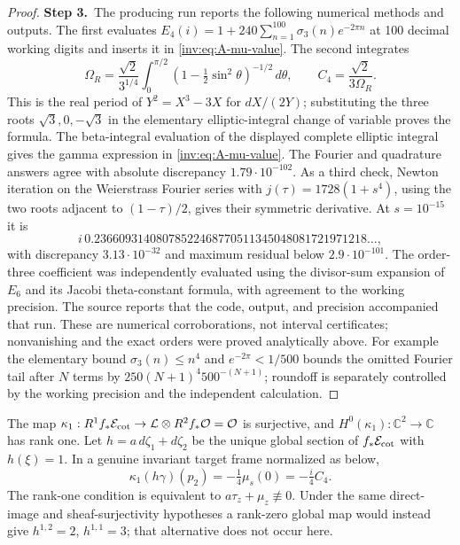\begin{proof}
\par\smallskip\noindent\textbf{Step 3.}\ The producing run reports the following numerical methods and outputs.  The first evaluates
$E_4(i)=1+240\sum_{n=1}^{100}\sigma_3(n)e^{-2\pi n}$ at 100
decimal working digits and inserts it in \eqref{inv:eq:A-mu-value}.
The second integrates
\[
\Omega_R=\frac{\sqrt2}{3^{1/4}}
\int_0^{\pi/2}(1-\tfrac12\sin^2\theta)^{-1/2}\,d\theta,
\qquad C_4=\frac{\sqrt2}{3\Omega_R}.
\]
This is the real period of $Y^2=X^3-3X$ for $dX/(2Y)$; substituting
the three roots $\sqrt3,0,-\sqrt3$ in the elementary elliptic-integral
change of variable proves the formula.  The beta-integral evaluation
of the displayed complete elliptic integral gives the gamma
expression in \eqref{inv:eq:A-mu-value}.  The Fourier and quadrature
answers agree with absolute discrepancy $1.79\cdot10^{-102}$.
As a third check, Newton iteration on the Weierstrass Fourier series
with $j(\tau)=1728(1+s^4)$, using the two roots adjacent to
$(1-\tau)/2$, gives their symmetric derivative.  At $s=10^{-15}$ it
is
\[
i\,0.23660931408078522468770511345048081721971218\ldots,
\]
with discrepancy $3.13\cdot10^{-32}$ and maximum residual below
$2.9\cdot10^{-101}$.  The order-three coefficient was independently
evaluated using the divisor-sum expansion of $E_6$ and its Jacobi
theta-constant formula, with agreement to the working precision.
The source reports that the code, output, and precision accompanied that run.  These are numerical
corroborations, not interval certificates; nonvanishing and the exact
orders were proved analytically above.  For example the elementary
bound $\sigma_3(n)\le n^4$ and $e^{-2\pi}<1/500$ bounds the omitted
Fourier tail after $N$ terms by
$250(N+1)^4 500^{-(N+1)}$; roundoff is separately controlled by
the working precision and the independent calculation.
\end{proof}

\begin{theorem}\label{inv:A2.4}
The map
$\kappa_1:R^1f_*\mathcal E_{\rm cot}\to\mathcal L\otimes R^2f_*\mathcal O=\mathcal O$
is surjective, and $H^0(\kappa_1):\mathbb C^2\to\mathbb C$ has rank one.
Let $h=a\,d\zeta_1+d\zeta_2$ be the unique global section of
$f_*\mathcal E_{\rm cot}$ with $h(\xi)=1$.  In a genuine invariant target
frame normalized as below,
\[
\kappa_1(h\gamma)(p_2)=-\tfrac14\mu_s(0)=-\tfrac i4 C_4.
\]
The rank-one condition is equivalent to
$a\tau_z+\mu_z\not\equiv0$.  Under the same direct-image and
sheaf-surjectivity hypotheses a rank-zero global map would instead
give $h^{1,2}=2$, $h^{1,1}=3$; that alternative does not occur here.
\end{theorem}

